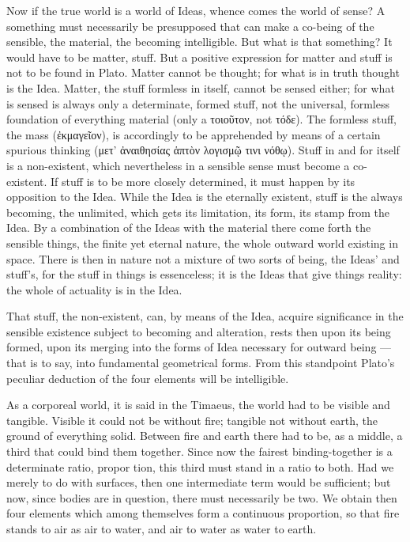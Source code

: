 \documentclass[12pt,a4paper]{book}
\begin{document}
Now if the true world is a world of Ideas, whence comes the world of sense? A something must necessarily be
presupposed that can make a co-being of the sensible, the material, the becoming intelligible. But what is that
something? It would have to be matter, stuff. But a positive expression for matter and stuff is not to be found in
Plato. Matter cannot be thought; for what is in truth thought is the Idea. Matter, the stuff formless in itself,
cannot be sensed either; for what is sensed is always only a determinate, formed stuff, not the universal, formless
foundation of everything material (only a τοιοῦτον, not τόδε).
The formless stuff, the mass (ἐκμαγεῖον), is accordingly to be apprehended by means of a certain spurious thinking
(μετ’ ἀναιθησίας ἁπτὸν λογισμῷ τινι νόθῳ). Stuff in and for itself is a non-existent, which nevertheless in a
sensible sense must become a co-existent. If stuff is to be more closely determined, it must happen by its
opposition to the Idea. While the Idea is the eternally existent, stuff is the always becoming, the unlimited, which
gets its limitation, its form, its stamp from the Idea. By a combination of the Ideas with the material there come
forth the sensible things, the finite yet eternal nature, the whole outward world existing in space. There is then
in nature not a mixture of two sorts of being, the Ideas' and stuff's, for the stuff in things is essenceless; it is
the Ideas that give things reality: the whole of actuality is in the Idea.

That stuff, the non-existent, can, by means of the Idea, acquire significance in the sensible existence subject to
becoming and alteration, rests then upon its being formed, upon its merging into the forms of Idea necessary for
outward being --- that is to say, into fundamental geometrical forms. From this standpoint Plato's peculiar
deduction of the four elements will be intelligible.

As a corporeal world, it is said in the Timaeus, the world had to be visible and tangible. Visible it could not be
without fire; tangible not without earth, the ground of everything solid. Between fire and earth there had to be, as
a middle, a third that could bind them together. Since now the fairest binding-together is
a determinate ratio, propor
tion, this third must stand in a ratio to both. Had we merely to do with surfaces, then one intermediate term
would be sufficient; but now, since bodies are in question, there must necessarily be two. We obtain then four
elements which among themselves form a continuous proportion, so that fire stands to air as air to water, and
air to water as water to earth.
\end{document}
